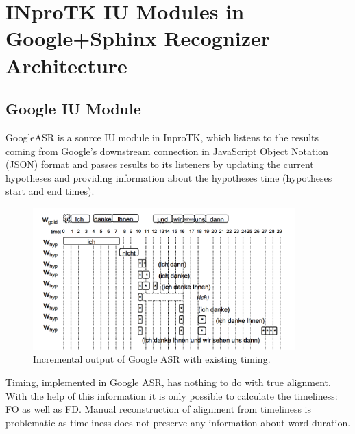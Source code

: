 \section {INproTK IU Modules in Google+Sphinx Recognizer Architecture}
\subsection  {Google IU Module}
GoogleASR is a source IU module in InproTK, which listens to the
results coming from Google's  downstream connection in JavaScript Object Notation (JSON) format and
passes results to its listeners by updating the current hypotheses and providing
information about the hypotheses time (hypotheses start and end times).
 \begin{figure}[htbp]
  \centering
   \includegraphics[width=0.9\textwidth]{images/google_output.png}
  \caption{Incremental output of Google ASR with existing timing.}
  \label{fig:google_ouput}
\end{figure}

Timing, implemented in Google ASR, has nothing to do with true alignment.
With the help of this information  it is only possible to calculate the
timeliness: FO as well as FD.  Manual reconstruction of alignment from
timeliness is problematic as timeliness does not preserve any information about word
duration. 

